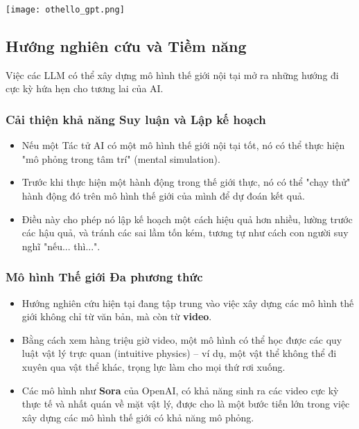 \begin{center}
    \texttt{[image: othello\_gpt.png]}
    \label{fig:othello_gpt}
\end{center}

\subsection{Hướng nghiên cứu và Tiềm năng}
\label{ssec:world_models_future}
Việc các LLM có thể xây dựng mô hình thế giới nội tại mở ra những hướng đi cực kỳ hứa hẹn cho tương lai của AI.

\subsubsection{Cải thiện khả năng Suy luận và Lập kế hoạch}
\begin{itemize}
    \item Nếu một Tác tử AI có một mô hình thế giới nội tại tốt, nó có thể thực hiện "mô phỏng trong tâm trí" (mental simulation).
    \item Trước khi thực hiện một hành động trong thế giới thực, nó có thể "chạy thử" hành động đó trên mô hình thế giới của mình để dự đoán kết quả.
    \item Điều này cho phép nó lập kế hoạch một cách hiệu quả hơn nhiều, lường trước các hậu quả, và tránh các sai lầm tốn kém, tương tự như cách con người suy nghĩ "nếu... thì...".
\end{itemize}

\subsubsection{Mô hình Thế giới Đa phương thức}
\begin{itemize}
    \item Hướng nghiên cứu hiện tại đang tập trung vào việc xây dựng các mô hình thế giới không chỉ từ văn bản, mà còn từ \textbf{video}.
    \item Bằng cách xem hàng triệu giờ video, một mô hình có thể học được các quy luật vật lý trực quan (intuitive physics) -- ví dụ, một vật thể không thể đi xuyên qua vật thể khác, trọng lực làm cho mọi thứ rơi xuống.
    \item Các mô hình như \textbf{Sora} của OpenAI, có khả năng sinh ra các video cực kỳ thực tế và nhất quán về mặt vật lý, được cho là một bước tiến lớn trong việc xây dựng các mô hình thế giới có khả năng mô phỏng.
\end{itemize}

